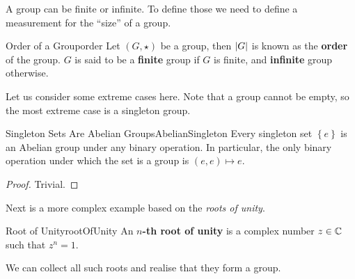 \documentclass[math]{amznotes}
\theoremstyle{remark}
\newcommand{\0}{\mathbf{0}}
\newcommand{\1}{\mathbf{1}}
\begin{document}
A group can be finite or infinite. To define those we need to define a measurement for the ``size'' of a group.
\begin{dfnbox}{Order of a Group}{order}
    Let $\left(G, \star\right)$ be a group, then ${\left\lvert {G} \right\rvert}$ is known as the {\color{red} \textbf{order}} of the group. $G$ is said to be a {\color{red} \textbf{finite}} group if $G$ is finite, and {\color{red} \textbf{infinite}} group otherwise.
\end{dfnbox}
Let us consider some extreme cases here. Note that a group cannot be empty, so the most extreme case is a singleton group.
\begin{probox}{Singleton Sets Are Abelian Groups}{AbelianSingleton}
    Every singleton set $\left\{e\right\}$ is an Abelian group under any binary operation. In particular, the only binary operation under which the set is a group is $\left(e, e\right) \mapsto e$.
    \tcblower
    \begin{proof}
        Trivial.
    \end{proof}
\end{probox}
Next is a more complex example based on the \textit{roots of unity}.
\begin{dfnbox}{Root of Unity}{rootOfUnity}
    An {\color{red} \textbf{$n$-th root of unity}} is a complex number $z \in \mathbb{C}$ such that $z^n = 1$.
\end{dfnbox}
We can collect all such roots and realise that they form a group.
\end{document}
